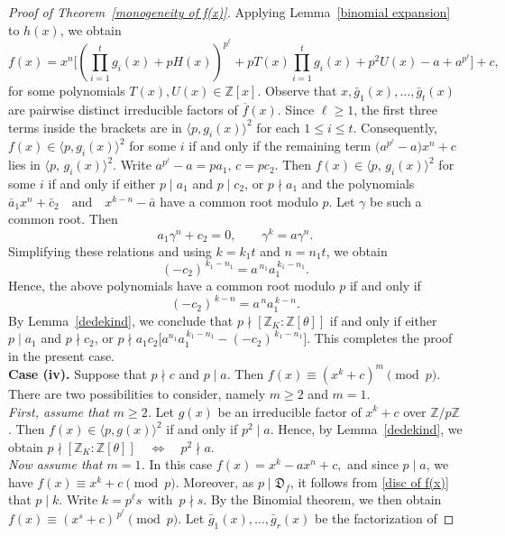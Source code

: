 \documentclass[table]{amsart}
\newcommand{\D}{\mathfrak{D}}
\numberwithin{equation}{section}
\begin{document}
\begin{proof}[Proof of Theorem~\ref{monogeneity of f(x)}]
Applying Lemma~\ref{binomial expansion} to $h(x)$, we obtain
\[
f(x)=x^{n}\Biggl[
\left(\prod_{i=1}^{t} g_i(x)+pH(x)\right)^{p^{\ell}}
+pT(x)\prod_{i=1}^{t} g_i(x)
+p^{2}U(x)
-a+a^{p^{\ell}}
\Biggr]+c,
\]
for some polynomials $T(x),U(x)\in\mathbb{Z}[x]$. Observe that $x,\bar g_{1}(x),\ldots,\bar g_{t}(x)$ are pairwise distinct
irreducible factors of $\overline{f}(x)$.
Since $\ell\ge1$, the first three terms inside the brackets are in
$\langle p,g_i(x)\rangle^{2}$ for each $1\le i\le t$.
Consequently, $f(x)\in\langle p,g_i(x)\rangle^{2}$ for some $i$ if and only if the remaining term $\bigl(a^{p^{\ell}}-a\bigr)x^{n}+c$
lies in $\langle p,\, g_i(x)\rangle^{2}$. Write $a^{p^{\ell}}-a=pa_{1},
\, c=pc_{2}.$
Then $f(x)\in\langle p,\,g_i(x)\rangle^{2}$ for some $i$ if and only if
either $p\mid a_{1}$ and $p\mid c_{2}$, or $p\nmid a_{1}$ and the
polynomials $\bar a_{1}x^{n}+\bar c_{2}
\quad\text{and}\quad
x^{k-n}-\bar a$ have a common root modulo $p$. Let $\gamma$ be such a common root. Then
\[
a_{1}\gamma^{n}+c_{2}=0,
\qquad
\gamma^{k}=a\gamma^{n}.
\]
Simplifying these relations and using $k=k_{1}t$ and $n=n_{1}t$, we obtain
\[
(-c_{2})^{\,k_{1}-n_{1}}=a^{\,n_{1}}a_{1}^{\,k_{1}-n_{1}}.
\]
Hence, the above polynomials have a common root modulo $p$ if and only if
\[
(-c_{2})^{\,k-n}=a^{\,n}a_{1}^{\,k-n}.
\]
By Lemma~\ref{dedekind}, we conclude that
$p\nmid[\mathbb{Z}_{K}:\mathbb{Z}[\theta]]$ if and only if either
$p\mid a_{1}$ and $p\nmid c_{2}$, or
$
p\nmid a_{1}c_2
\bigl[a^{n_{1}}a_{1}^{\,k_{1}-n_{1}}-(-c_{2})^{\,k_{1}-n_{1}}\bigr].$
This completes the proof in the present case.\\[2mm]
\textbf{Case (iv).} Suppose that $p\nmid c$ and $p\mid a$. Then $f(x) \equiv (x^{k}+c)^{m} \pmod{p}.$ There are two possibilities to consider, namely $m\ge 2$ and $m=1$.\\
\emph{First, assume that $m\ge 2$.}
Let $g(x)$ be an irreducible factor of $x^{k}+c$ over $\mathbb{Z}/p\mathbb{Z}$.
Then $f(x)\in\langle p,g(x)\rangle^{2}$ if and only if $p^{2}\mid a$.
Hence, by Lemma~\ref{dedekind}, we obtain $p\nmid [\mathbb{Z}_{K}:\mathbb{Z}[\theta]]
\quad \Longleftrightarrow \quad
p^{2}\nmid a.$\\
\emph{Now assume that $m=1$.}
In this case $f(x)=x^{k}-ax^{n}+c,$ and since $p\mid a$, we have $f(x)\equiv x^{k}+c \pmod{p}.$ Moreover, as $p\mid \D_f$, it follows from \eqref{disc of f(x)} that $p\mid k$. Write $k=p^{\ell}s \, \text{ with }\, p\nmid s.$ By the Binomial theorem, we then obtain $f(x)\equiv (x^{s}+c)^{\,p^{\ell}} \pmod{p}.$ Let $\bar g_{1}(x),\ldots,\bar g_{r}(x)$ be the factorization of

\end{proof}
\end{document}
